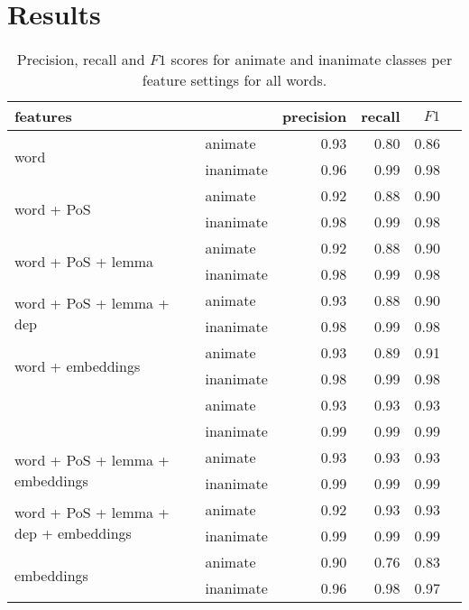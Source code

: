 \documentclass[a4paper, twocolumn, 11pt]{article}
\begin{document}
\section{Results}
\begin{table*}
\centering
\begin{tabular}{llrrrr}
\toprule
features                                                 &           & precision & recall & $F1$ \\ \midrule
\multirow{2}{*}{word}                                    & animate   & 0.93      & 0.80   & 0.86 \\
                                                         & inanimate & 0.96      & 0.99   & 0.98 \\
\multirow{2}{*}{word + PoS}                              & animate   & 0.92      & 0.88   & 0.90 \\
                                                         & inanimate & 0.98      & 0.99   & 0.98 \\
\multirow{2}{*}{word + PoS + lemma}                      & animate   & 0.92      & 0.88   & 0.90 \\
                                                         & inanimate & 0.98      & 0.99   & 0.98 \\
\multirow{2}{*}{word + PoS + lemma + dep}                & animate   & 0.93      & 0.88   & 0.90 \\
                                                         & inanimate & 0.98      & 0.99   & 0.98 \\
\multirow{2}{*}{word + embeddings}                       & animate   & 0.93      & 0.89   & 0.91 \\
                                                         & inanimate & 0.98      & 0.99   & 0.98 \\
\rowcolor{Gray}                                          & animate   & 0.93      & 0.93   & 0.93 \\
\rowcolor{Gray}\multirow{-2}{*}{word + PoS + embeddings} & inanimate & 0.99      & 0.99   & 0.99 \\
\multirow{2}{*}{word + PoS + lemma + embeddings}         & animate   & 0.93      & 0.93   & 0.93 \\
                                                         & inanimate & 0.99      & 0.99   & 0.99 \\
\multirow{2}{*}{word + PoS + lemma + dep + embeddings}   & animate   & 0.92      & 0.93   & 0.93 \\
                                                         & inanimate & 0.99      & 0.99   & 0.99 \\
\multirow{2}{*}{embeddings}                              & animate   & 0.90      & 0.76   & 0.83 \\
                                                         & inanimate & 0.96      & 0.98   & 0.97 \\

\bottomrule
\end{tabular}
\caption{Precision, recall and $F1$ scores for animate and inanimate classes per feature settings for all words.}
\label{tab:results-all}
\end{table*}
\end{document}
